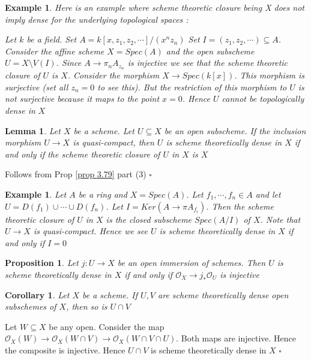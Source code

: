 \documentclass{article}
\newtheorem{lemma}[theorem]{Lemma}
\newtheorem{corollary}[theorem]{Corollary}
\newtheorem{example}[theorem]{Example}
\newtheorem{proposition}[theorem]{Proposition}
\newenvironment{Proof}{{\noindent \indent \it Proof:\quad}}{\hfill $\square$\par}
\begin{document}
\begin{example}
Here is an example where scheme theoretic closure being X does not imply dense for the underlying topological spaces :

Let $k$ be a field. Set $A=k[x,z_1,z_2,\cdots]/(x^nz_n)$ Set $I=(z_1,z_2,\cdots) \subseteq A$.
Consider the affine scheme $X=Spec(A)$ and the open subscheme $U=X\setminus V(I)$. Since $A \to \pi_nA_{z_n}$ is injective we see that the scheme theoretic closure of $U$ is $X$. 
Consider the morphism $X \to Spec(k[x])$. This morphism is surjective (set all $z_n=0$ to see this). But the restriction of this morphism to $U$ is not surjective because it maps to the point $x=0$. Hence $U$ cannot be topologically dense in $X$
\end{example}

\begin{lemma}
    Let $X$ be a scheme. Let $U \subseteq X$ be an open subscheme. If the inclusion morphism $U \to X$ is quasi-compact, then $U$ is scheme theoretically dense in $X$ if and only if the scheme theoretic closure of $U$ in $X$ is $X$
\end{lemma}
\begin{Proof}
    Follows from Prop \ref{prop 3.79} part (3)
\end{Proof}

\begin{example}
    Let $A$ be a ring and $X=Spec(A)$. Let $f_1,\cdots,f_n\in A$ and let $U=D(f_1)\cup\cdots\cup D(f_n)$. Let $I=Ker(A \to \pi A_{f_i})$. Then the scheme theoretic closure of $U$ in $X$ is the closed subscheme $Spec(A/I)$ of $X$. Note that $U \to X$ is quasi-compact. Hence we see $U$ is scheme theoretically dense in $X$ if and only if $I=0$
\end{example}

\begin{proposition}
    Let $j:U \to X$ be an open immersion of schemes. Then $U$ is scheme theoretically dense in $X$ if and only if $\mathcal O_X \to j_\ast \mathcal O_U$ is injective
\end{proposition}

\begin{corollary}
    Let $X$ be a scheme. If $U, V$ are scheme theoretically dense open subschemes of $X$, then so is $U∩V$
\end{corollary}
\begin{Proof}
Let $W \subseteq X$ be any open. Consider the map $\mathcal O_X(W) \to \mathcal O_X(W\cap V) \to \mathcal O_X(W\cap V\cap U)$. Both maps are injective. Hence the composite is injective. Hence $U\cap V$ is scheme theoretically dense in $X$
\end{Proof}
\end{document}
